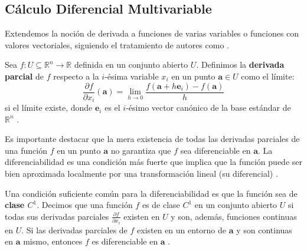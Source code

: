 \subsection{Cálculo Diferencial Multivariable}
\label{subsec:multivariable_calculus_general}

Extendemos la noción de derivada a funciones de varias variables o funciones con valores vectoriales, siguiendo el tratamiento de autores como \citet{Apostol1974}.

\begin{definition}
\label{def:partial_derivative_general}
Sea $f: U \subseteq \mathbb{R}^n \to \mathbb{R}$ definida en un conjunto abierto $U$. Definimos la \textbf{derivada parcial} de $f$ respecto a la $i$-ésima variable $x_i$ en un punto $\mathbf{a} \in U$ como el límite:
\[ \frac{\partial f}{\partial x_i}(\mathbf{a}) = \lim_{h \to 0} \frac{f(\mathbf{a} + h\mathbf{e}_i) - f(\mathbf{a})}{h} \]
si el límite existe, donde $\mathbf{e}_i$ es el $i$-ésimo vector canónico de la base estándar de $\mathbb{R}^n$ \citep{Rudin1976}.
\end{definition}

Es importante destacar que la mera existencia de todas las derivadas parciales de una función $f$ en un punto $\mathbf{a}$ no garantiza que $f$ sea diferenciable en $\mathbf{a}$. La diferenciabilidad es una condición más fuerte que implica que la función puede ser bien aproximada localmente por una transformación lineal (su diferencial) \citep{Apostol1974, Rudin1976}.

Una condición suficiente común para la diferenciabilidad es que la función sea de \textbf{clase $C^1$}. Decimos que una función $f$ es de clase $C^1$ en un conjunto abierto $U$ si todas sus derivadas parciales $\frac{\partial f}{\partial x_i}$ existen en $U$ y son, además, funciones continuas en $U$. Si las derivadas parciales de $f$ existen en un entorno de $\mathbf{a}$ y son continuas en $\mathbf{a}$ mismo, entonces $f$ es diferenciable en $\mathbf{a}$ \citep{Apostol1974}.

